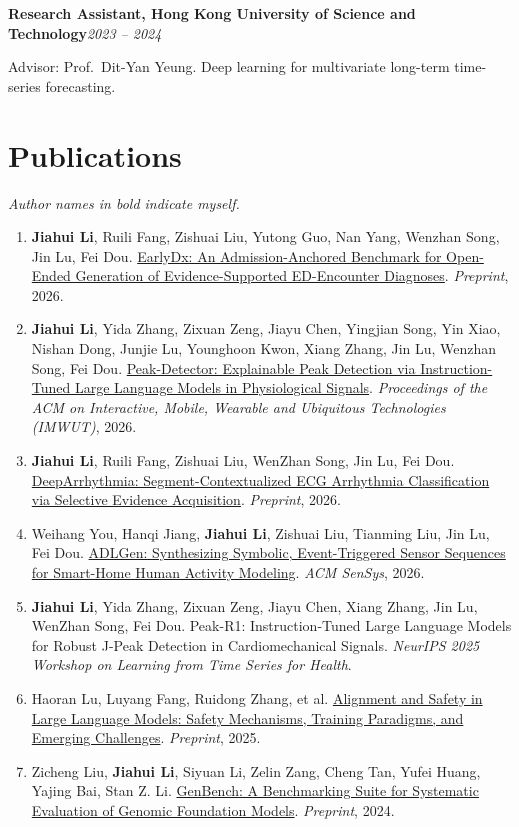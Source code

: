 \documentclass[10pt,a4paper]{article}
\newcommand{\entry}[2]{%
  \noindent\textbf{#1}\hfill\textit{\small #2}\par\vspace{0.15em}}
\begin{document}
\entry{Research Assistant, Hong Kong University of Science and Technology}{2023 -- 2024}
Advisor: Prof.\ Dit-Yan Yeung. Deep learning for multivariate long-term time-series forecasting.

\section{Publications}
\textit{\small Author names in bold indicate myself.}
\vspace{0.15em}

\begin{enumerate}

\item \textbf{Jiahui Li}, Ruili Fang, Zishuai Liu, Yutong Guo, Nan Yang, Wenzhan Song, Jin Lu, Fei Dou.
\href{https://arxiv.org/abs/2607.28788}{EarlyDx: An Admission-Anchored Benchmark for Open-Ended
Generation of Evidence-Supported ED-Encounter Diagnoses}. \textit{Preprint}, 2026.

\item \textbf{Jiahui Li}, Yida Zhang, Zixuan Zeng, Jiayu Chen, Yingjian Song, Yin Xiao, Nishan Dong,
Junjie Lu, Younghoon Kwon, Xiang Zhang, Jin Lu, Wenzhan Song, Fei Dou.
\href{https://dl.acm.org/doi/10.1145/3810224}{Peak-Detector: Explainable Peak Detection via
Instruction-Tuned Large Language Models in Physiological Signals}.
\textit{Proceedings of the ACM on Interactive, Mobile, Wearable and Ubiquitous Technologies
(IMWUT)}, 2026.

\item \textbf{Jiahui Li}, Ruili Fang, Zishuai Liu, WenZhan Song, Jin Lu, Fei Dou.
\href{https://arxiv.org/abs/2605.16441}{DeepArrhythmia: Segment-Contextualized ECG Arrhythmia
Classification via Selective Evidence Acquisition}. \textit{Preprint}, 2026.

\item Weihang You, Hanqi Jiang, \textbf{Jiahui Li}, Zishuai Liu, Tianming Liu, Jin Lu, Fei Dou.
\href{https://dl.acm.org/doi/10.1145/3774906.3802796}{ADLGen: Synthesizing Symbolic, Event-Triggered
Sensor Sequences for Smart-Home Human Activity Modeling}. \textit{ACM SenSys}, 2026.

\item \textbf{Jiahui Li}, Yida Zhang, Zixuan Zeng, Jiayu Chen, Xiang Zhang, Jin Lu, WenZhan Song, Fei Dou.
Peak-R1: Instruction-Tuned Large Language Models for Robust J-Peak Detection in Cardiomechanical
Signals. \textit{NeurIPS 2025 Workshop on Learning from Time Series for Health}.

\item Haoran Lu, Luyang Fang, Ruidong Zhang, et al.
\href{https://arxiv.org/abs/2507.19672}{Alignment and Safety in Large Language Models: Safety
Mechanisms, Training Paradigms, and Emerging Challenges}. \textit{Preprint}, 2025.

\item Zicheng Liu, \textbf{Jiahui Li}, Siyuan Li, Zelin Zang, Cheng Tan, Yufei Huang, Yajing Bai, Stan Z. Li.
\href{https://arxiv.org/abs/2406.01627}{GenBench: A Benchmarking Suite for Systematic Evaluation of
Genomic Foundation Models}. \textit{Preprint}, 2024.

\end{enumerate}
\end{document}
